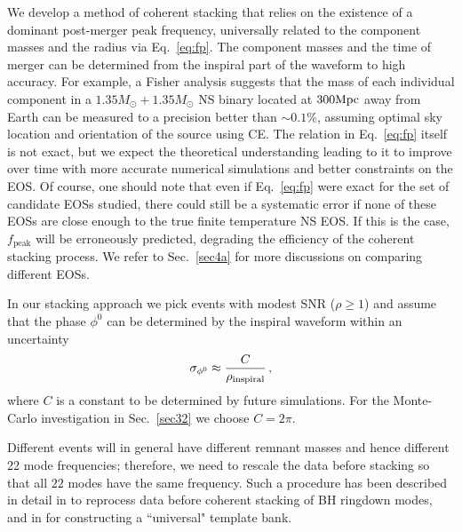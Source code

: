 \documentclass[prd,aps,floatfix,superscriptaddress,nofootinbib,twocolumn,10pt,English]{revtex4-1}
\begin{document}
We develop a method of coherent stacking that relies on the existence
of a dominant post-merger peak frequency, universally related to the
component masses and the radius via Eq.~\eqref{eq:fp}. The component
masses and the time of merger can be determined from the inspiral part
of the waveform to high accuracy. For example, a Fisher analysis
suggests that the mass of each individual component in a $1.35
M_\odot+1.35M_\odot$ NS binary located at $300 {\rm Mpc}$ away from
Earth can be measured to a precision better than $\sim 0.1\%$,
assuming optimal sky location and orientation of the source using CE.
The relation in Eq.~\eqref{eq:fp} itself is not exact, but we expect
the theoretical understanding leading to it to improve over time with
more accurate numerical simulations and better constraints on the
EOS. Of course, one should note that even if Eq.~\eqref{eq:fp} were
exact for the set of candidate EOSs studied, there could still be a
systematic error if none of these EOSs are close enough to the true
finite temperature NS EOS. If this is the case, $f_\mathrm{peak}$ will
be erroneously predicted, degrading the efficiency of the coherent
stacking process.  We refer to Sec.~\ref{sec4a} for more discussions
on comparing different EOSs.


In our stacking approach we pick events with modest SNR ($\rho \ge 1$)
and assume that the phase $\phi^0$ can be determined by the inspiral
waveform within an uncertainty
\begin{align}
\label{eq:phase-uncertainty}
\sigma_{\phi^0} \approx \frac{C}{\rho_{\rm inspiral}}\,,
\end{align}
where $C$ is a constant to be determined by future simulations. For
the Monte-Carlo investigation in Sec.~\ref{sec32} we choose
$C=2\pi$.

Different events will in general have different remnant masses and
hence different 22 mode frequencies; therefore, we need to rescale the
data before stacking so that all $22$ modes have the same
frequency. Such a procedure has been described in detail in
\cite{yang2017black} to reprocess data before coherent stacking of BH
ringdown modes, and in \cite{clark2016observing} for constructing a
``universal" template bank.
\end{document}
